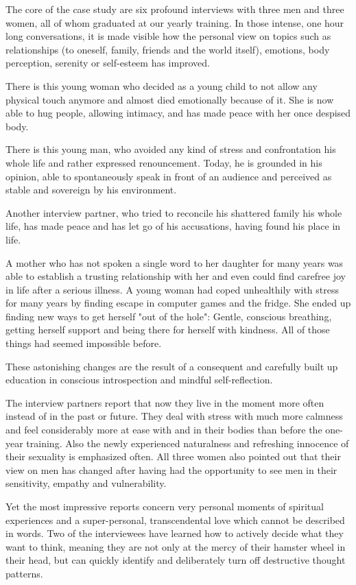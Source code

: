 The core of the case study are six profound interviews with three men and three women, all of whom graduated at our yearly training. In those intense, one hour long conversations, it is made visible how the personal view on topics such as relationships (to oneself, family, friends and the world itself), emotions, body perception, serenity or self-esteem has improved.

There is this young woman who decided as a young child to not allow any physical touch anymore and almost died emotionally because of it. She is now able to hug people, allowing intimacy, and has made peace with her once despised body.

There is this young man, who avoided any kind of stress and confrontation his whole life and rather expressed renouncement. Today, he is grounded in his opinion, able to spontaneously speak in front of an audience and perceived as stable and sovereign by his environment.

Another interview partner, who tried to reconcile his shattered family his whole life, has made peace and has let go of his accusations, having found his place in life.

A mother who has not spoken a single word to her daughter for many years was able to establish a trusting relationship with her and even could find carefree joy in life after a serious illness.
A young woman had coped unhealthily with stress for many years by finding escape in computer games and the fridge. She ended up finding new ways to get herself "out of the hole": Gentle, conscious breathing, getting herself support and being there for herself with kindness. All of those things had seemed impossible before.

These astonishing changes are the result of a consequent and carefully built up education in conscious introspection and mindful self-reflection.

The interview partners report that now they live in the moment more often instead of in the past or future. They deal with stress with much more calmness and feel considerably more at ease with and in their bodies than before the one-year training. Also the newly experienced naturalness and refreshing innocence of their sexuality is emphasized often. All three women also pointed out that their view on men has changed after having had the opportunity to see men in their sensitivity, empathy and vulnerability.

Yet the most impressive reports concern very personal moments of spiritual experiences and a super-personal, transcendental love which cannot be described in words. Two of the interviewees have learned how to actively decide what they want to think, meaning they are not only at the mercy of their hamster wheel in their head, but can quickly identify and deliberately turn off destructive thought patterns.

